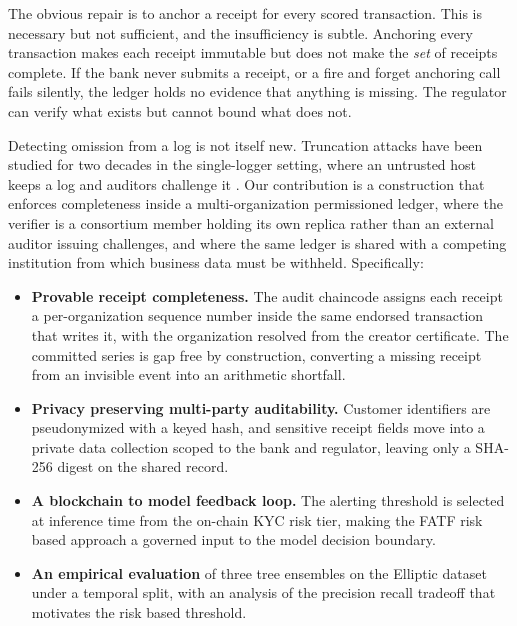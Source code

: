 \documentclass[conference]{IEEEtran}
\begin{document}
The obvious repair is to anchor a receipt for every scored transaction. This is
necessary but not sufficient, and the insufficiency is subtle. Anchoring every
transaction makes each receipt immutable but does not make the \emph{set} of
receipts complete. If the bank never submits a receipt, or a fire and forget
anchoring call fails silently, the ledger holds no evidence that anything is
missing. The regulator can verify what exists but cannot bound what does not.

Detecting omission from a log is not itself new. Truncation attacks have been
studied for two decades in the single-logger setting, where an untrusted host
keeps a log and auditors challenge it
\cite{crosby2009tamperevident,guardiola2023sealfsv2}. Our
contribution is a construction that enforces completeness inside a
multi-organization permissioned ledger, where the verifier is a consortium
member holding its own replica rather than an external auditor issuing
challenges, and where the same ledger is shared with a competing institution
from which business data must be withheld. Specifically:

\begin{itemize}\itemsep1pt
\item \textbf{Provable receipt completeness.} The audit chaincode assigns each
receipt a per-organization sequence number inside the same endorsed transaction
that writes it, with the organization resolved from the creator certificate.
The committed series is gap free by construction, converting a missing receipt
from an invisible event into an arithmetic shortfall.
\item \textbf{Privacy preserving multi-party auditability.} Customer identifiers
are pseudonymized with a keyed hash, and sensitive receipt fields move into a
private data collection scoped to the bank and regulator, leaving only a
SHA-256 digest on the shared record.
\item \textbf{A blockchain to model feedback loop.} The alerting threshold is
selected at inference time from the on-chain KYC risk tier, making the FATF
risk based approach a governed input to the model decision boundary.
\item \textbf{An empirical evaluation} of three tree ensembles on the Elliptic
dataset under a temporal split, with an analysis of the precision recall
tradeoff that motivates the risk based threshold.
\end{itemize}

\end{document}
